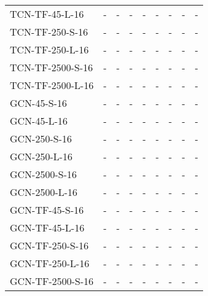 \begin{table*}[h]
\begin{tabular}{lcccccccc}
        TCN-TF-45-L-16               
            & - & - & - & - & - & - & - & - \\
        TCN-TF-250-S-16               
            & - & - & - & - & - & - & - & - \\
        TCN-TF-250-L-16               
            & - & - & - & - & - & - & - & - \\
        TCN-TF-2500-S-16               
            & - & - & - & - & - & - & - & - \\
        TCN-TF-2500-L-16               
            & - & - & - & - & - & - & - & - \\
        \midrule
        GCN-45-S-16               
            & - & - & - & - & - & - & - & - \\ 
        GCN-45-L-16               
            & - & - & - & - & - & - & - & - \\
        GCN-250-S-16               
            & - & - & - & - & - & - & - & - \\ 
        GCN-250-L-16               
            & - & - & - & - & - & - & - & - \\
        GCN-2500-S-16               
            & - & - & - & - & - & - & - & - \\ 
        GCN-2500-L-16               
            & - & - & - & - & - & - & - & - \\
        \midrule
        GCN-TF-45-S-16               
            & - & - & - & - & - & - & - & - \\
        GCN-TF-45-L-16               
            & - & - & - & - & - & - & - & - \\
        GCN-TF-250-S-16               
            & - & - & - & - & - & - & - & - \\
        GCN-TF-250-L-16               
            & - & - & - & - & - & - & - & - \\
        GCN-TF-2500-S-16               
            & - & - & - & - & - & - & - & - \\

\end{tabular}
\end{table*}
